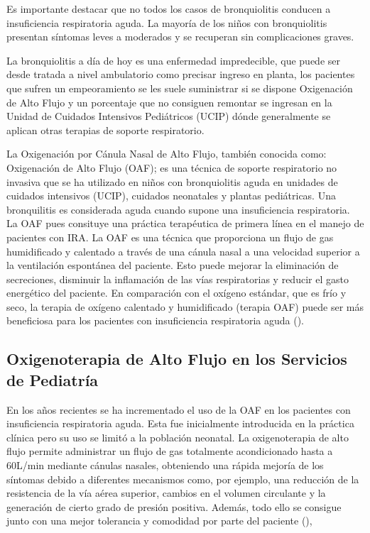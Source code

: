 Es importante destacar que no todos los casos de bronquiolitis conducen a insuficiencia respiratoria aguda. La mayoría de los niños con bronquiolitis presentan síntomas leves a moderados y se recuperan sin complicaciones graves. 

La bronquiolitis a día de hoy es una enfermedad impredecible, que puede ser desde tratada a nivel ambulatorio como precisar ingreso en planta, los pacientes que sufren un empeoramiento se les suele suministrar si se dispone Oxigenación de Alto Flujo y un porcentaje que no consiguen remontar se ingresan en la Unidad de Cuidados Intensivos Pediátricos (UCIP) dónde generalmente se aplican otras terapias de soporte respiratorio. 

La Oxigenación por Cánula Nasal de Alto Flujo, también conocida como: Oxigenación de Alto Flujo (OAF); es una técnica de soporte respiratorio no invasiva que se ha utilizado en niños con bronquiolitis aguda en unidades de cuidados intensivos (UCIP), cuidados neonatales y plantas pediátricas. Una bronquilitis es considerada aguda cuando supone una insuficiencia respiratoria. La OAF pues consituye una práctica terapéutica de primera línea en el manejo de pacientes con IRA. La OAF es una técnica que proporciona un flujo de gas humidificado y calentado a través de una cánula nasal a una velocidad superior a la ventilación espontánea del paciente. Esto puede mejorar la eliminación de secreciones, disminuir la inflamación de las vías respiratorias y reducir el gasto energético del paciente. En comparación con el oxígeno estándar, que es frío y seco, la terapia de oxígeno calentado y humidificado (terapia OAF) puede ser más beneficiosa para los pacientes con insuficiencia respiratoria aguda (\cite{Daverio2019}).


\subsection{Oxigenoterapia de Alto Flujo en los Servicios de Pediatría} 

En los años recientes se ha incrementado el uso de la OAF en los pacientes con insuficiencia respiratoria aguda. Esta fue inicialmente introducida en la práctica clínica pero su uso se limitó a la población neonatal. La oxigenoterapia de alto flujo permite administrar un flujo de gas totalmente acondicionado hasta a 60L/min mediante cánulas nasales, obteniendo una rápida mejoría de los síntomas debido a diferentes mecanismos como, por ejemplo, una reducción de la resistencia de la vía aérea superior, cambios en el volumen circulante y la generación de cierto grado de presión positiva. Además, todo ello se consigue junto con una mejor tolerancia y comodidad por parte del paciente (\cite{Masclans2015}),

